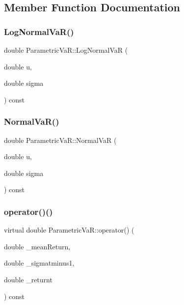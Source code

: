 \subsection{Member Function Documentation}
\hypertarget{classParametricVaR_aa26635a0fe04bd06580c50855360128a}{}\label{classParametricVaR_aa26635a0fe04bd06580c50855360128a} 
\subsubsection{\texorpdfstring{Log\+Normal\+Va\+R()}{LogNormalVaR()}}
{\footnotesize\ttfamily double Parametric\+Va\+R\+::\+Log\+Normal\+VaR (\begin{DoxyParamCaption}\item[{double}]{u,  }\item[{double}]{sigma }\end{DoxyParamCaption}) const}

\hypertarget{classParametricVaR_afdcc1e8748cff0a19d731f7a22c1d0c9}{}\label{classParametricVaR_afdcc1e8748cff0a19d731f7a22c1d0c9} 
\subsubsection{\texorpdfstring{Normal\+Va\+R()}{NormalVaR()}}
{\footnotesize\ttfamily double Parametric\+Va\+R\+::\+Normal\+VaR (\begin{DoxyParamCaption}\item[{double}]{u,  }\item[{double}]{sigma }\end{DoxyParamCaption}) const}

\hypertarget{classParametricVaR_a54589e13bb45da786d574656eb67b5fb}{}\label{classParametricVaR_a54589e13bb45da786d574656eb67b5fb} 
\subsubsection{\texorpdfstring{operator()()}{operator()()}\hspace{0.1cm}{\footnotesize\ttfamily [1/3]}}
{\footnotesize\ttfamily virtual double Parametric\+Va\+R\+::operator() (\begin{DoxyParamCaption}\item[{double}]{\+\_\+mean\+Return,  }\item[{double}]{\+\_\+sigmatminus1,  }\item[{double}]{\+\_\+returnt }\end{DoxyParamCaption}) const\hspace{0.3cm}{\ttfamily [pure virtual]}}




